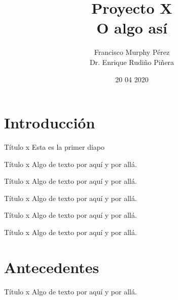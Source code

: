\documentclass{beamer}
\title{Proyecto X \\ O algo así}
\author{Francisco Murphy Pérez \\ Dr. Enrique Rudiño Piñera}
\institute{Instituto de Biotecnología \\ Universidad Nacional Autónoma de México}
\date{20 04 2020}
\begin{document}

\begin{frame}
	\maketitle %
\end{frame}


\section{Introducción}

\begin{frame}{Título x}
Esta es la primer diapo
\end{frame}

\begin{frame}{Título x}
	Algo de texto por aquí y por allá.
\end{frame}

\begin{frame}{Título x}
	Algo de texto por aquí y por allá.
\end{frame}

\begin{frame}{Título x}
	Algo de texto por aquí y por allá.
\end{frame}

\begin{frame}{Título x}
	Algo de texto por aquí y por allá.
\end{frame}

\begin{frame}{Título x}
	Algo de texto por aquí y por allá.
\end{frame}


\section{Antecedentes}

\begin{frame}{Título x}
	Algo de texto por aquí y por allá.
\end{frame}
\end{document}
